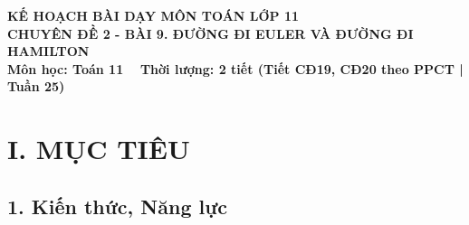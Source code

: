 \documentclass[12pt, a4paper]{article}
\begin{document}
\begin{center}
    {\fontsize{14pt}{17pt}\selectfont \textbf{KẾ HOẠCH BÀI DẠY MÔN TOÁN LỚP 11}}\\[6pt]
    {\fontsize{16pt}{19pt}\selectfont \textbf{CHUYÊN ĐỀ 2 - BÀI 9. ĐƯỜNG ĐI EULER VÀ ĐƯỜNG ĐI HAMILTON}}\\[4pt]
    {\fontsize{12pt}{15pt}\selectfont \textbf{Môn học: Toán 11} \ \textbar \ \textbf{Thời lượng: 2 tiết (Tiết CĐ19, CĐ20 theo PPCT | Tuần 25)}}
\end{center}

\vspace{5pt}

\section*{I. MỤC TIÊU}

\subsection*{1. Kiến thức, Năng lực}
\end{document}
